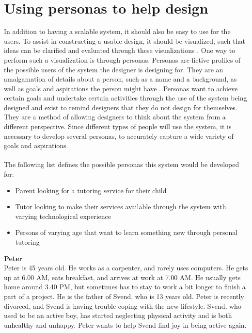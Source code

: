 \section{Using personas to help design}\label{sec:personas}
In addition to having a scalable system, it should also be easy to use for the users.
To assist in constructing a usable design, it should be visualized, such that ideas can be clarified and evaluated through these visualizations \cite{DEB}.
One way to perform such a visualization is through personas.
Personas are fictive profiles of the possible users of the system the designer is designing for.
They are an amalgamation of details about a person, such as a name and a background, as well as goals and aspirations the person might have \cite{DEB}.
Personas want to achieve certain goals and undertake certain activities through the use of the system being designed and exist to remind designers that they do not design for themselves.
They are a method of allowing designers to think about the system from a different perspective.
Since different types of people will use the system, it is necessary to develop several personas, to accurately capture a wide variety of goals and aspirations.
\\\\
The following list defines the possible personas this system would be developed for:
\begin{itemize}
    \item Parent looking for a tutoring service for their child
    \item Tutor looking to make their services available through the system with varying technological experience
    \item Persons of varying age that want to learn something new through personal tutoring
\end{itemize}
\noindent
\textbf{Peter}
\\
Peter is 45 years old.
He works as a carpenter, and rarely uses computers.
He gets up at 6.00 AM, eats breakfast, and arrives at work at 7.00 AM.
He usually gets home around 3.40 PM, but sometimes has to stay to work a bit longer to finish a part of a project.
He is the father of Svend, who is 13 years old.
Peter is recently divorced, and Svend is having trouble coping with the new lifestyle.
Svend, who used to be an active boy, has started neglecting physical activity and is both unhealthy and unhappy.
Peter wants to help Svend find joy in being active again. 
\\\\
